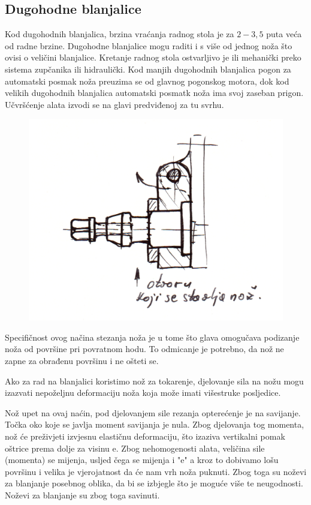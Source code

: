 \documentclass[a4paper,12pt]{article}
\numberwithin{figure}{section}
\begin{document}
\subsection{Dugohodne blanjalice}
Kod dugohodnih blanjalica, brzina vraćanja radnog stola je  za $2 -3,5$ puta veća od radne brzine. Dugohodne blanjalice mogu raditi i s više od jednog noža što ovisi o veličini blanjalice. Kretanje radnog stola ostvarljivo je ili mehanički preko sistema zupčanika ili hidraulički. Kod manjih dugohodnih blanjalica pogon za automatski posmak noža preuzima se od glavnog pogonskog motora, dok kod velikih dugohodnih blanjalica automatski posmatk noža ima svoj zaseban prigon. Učvršćenje alata izvodi se na glavi predviđenoj za tu svrhu.
\begin{figure}[!h]
\centering
\includegraphics[scale=0.15]{image_16-1.png}
\end{figure}
\FloatBarrier
Specifičnost ovog načina stezanja noža je u tome što glava omogučava podizanje noža od površine pri povratnom hodu. To odmicanje je potrebno, da nož ne zapne za obrađenu površinu i ne ošteti se.\par 
Ako za rad na blanjalici koristimo nož za tokarenje, djelovanje sila na nožu mogu izazvati nepoželjnu deformaciju noža koja može imati višestruke posljedice. \par
Nož upet na ovaj naćin, pod djelovanjem sile rezanja opterećenje je na savijanje. Točka oko koje se javlja moment savijanja je nula. Zbog djelovanja tog momenta, nož će preživjeti izvjesnu elastičnu deformaciju, što izaziva vertikalni pomak oštrice prema dolje za visinu e. Zbog nehomogenosti alata, veličina sile (momenta) se mijenja, usljed čega se mijenja i "e" a kroz to dobivamo lošu površinu i velika je vjerojatnost da će nam vrh noža puknuti. Zbog toga su noževi za blanjanje posebnog oblika, da bi se izbjegle što je moguće više te neugodnosti. Noževi za blanjanje su zbog toga savinuti.
\end{document}
